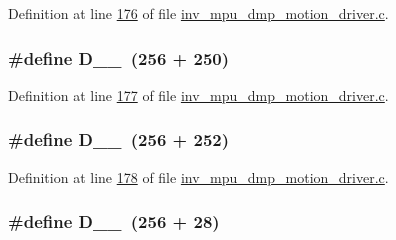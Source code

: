 Definition at line \hyperlink{inv__mpu__dmp__motion__driver_8c_source_l00176}{176} of file \hyperlink{inv__mpu__dmp__motion__driver_8c_source}{inv\+\_\+mpu\+\_\+dmp\+\_\+motion\+\_\+driver.\+c}.

\subsubsection[{\texorpdfstring{D\+\_\+1\+\_\+250}{D_1_250}}]{\setlength{\rightskip}{0pt plus 5cm}\#define D\+\_\+\_~(256 + 250)}\hypertarget{group___d_r_i_v_e_r_s_gab5988bd1329cb108a57a5e81ecd2c26b}{}\label{group___d_r_i_v_e_r_s_gab5988bd1329cb108a57a5e81ecd2c26b}


Definition at line \hyperlink{inv__mpu__dmp__motion__driver_8c_source_l00177}{177} of file \hyperlink{inv__mpu__dmp__motion__driver_8c_source}{inv\+\_\+mpu\+\_\+dmp\+\_\+motion\+\_\+driver.\+c}.

\subsubsection[{\texorpdfstring{D\+\_\+1\+\_\+252}{D_1_252}}]{\setlength{\rightskip}{0pt plus 5cm}\#define D\+\_\+\_~(256 + 252)}\hypertarget{group___d_r_i_v_e_r_s_ga0f11a9f42b3d13434b8a62aefd077912}{}\label{group___d_r_i_v_e_r_s_ga0f11a9f42b3d13434b8a62aefd077912}


Definition at line \hyperlink{inv__mpu__dmp__motion__driver_8c_source_l00178}{178} of file \hyperlink{inv__mpu__dmp__motion__driver_8c_source}{inv\+\_\+mpu\+\_\+dmp\+\_\+motion\+\_\+driver.\+c}.

\subsubsection[{\texorpdfstring{D\+\_\+1\+\_\+28}{D_1_28}}]{\setlength{\rightskip}{0pt plus 5cm}\#define D\+\_\+\_~(256 + 28)}\hypertarget{group___d_r_i_v_e_r_s_ga2533cfdd19cb87a86667620a33a9d561}{}\label{group___d_r_i_v_e_r_s_ga2533cfdd19cb87a86667620a33a9d561}


